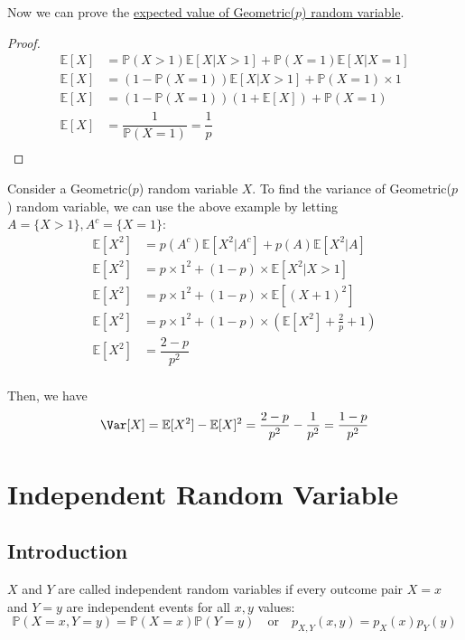 Now we can prove the \hyperlink{page.27}{expected value of Geometric(\(p\)) random variable}. 
\begin{proof}
    \[
        \begin{aligned}
            \mathbb{E}[X] &= \mathbb{P}(X > 1)\mathbb{E}[X \vert X > 1] + \mathbb{P}(X = 1)\mathbb{E}[X \vert X = 1] \\
            \mathbb{E}[X] &= (1 - \mathbb{P}(X = 1))\mathbb{E}[X \vert X > 1] + \mathbb{P}(X = 1) \times 1 \\
            \mathbb{E}[X] &= (1 - \mathbb{P}(X = 1))(1 + \mathbb{E}[X]) + \mathbb{P}(X = 1)\\
            \mathbb{E}[X] &= \dfrac{1}{\mathbb{P}(X = 1)} = \dfrac{1}{p}\\
        \end{aligned}
    \]
\end{proof}

Consider a Geometric(\(p\)) random variable \(X\). To find the variance of Geometric(\(p\)) random variable, we can use the above example by letting \(A = \{X > 1\}, A^c = \{X = 1\}\):
\[
\begin{aligned}
    \mathbb{E}[X^2] &= p(A^c)\mathbb{E}[X^2 \vert A^c] + p(A)\mathbb{E}[X^2 \vert A] \\
    \mathbb{E}[X^2] &= p \times 1^2 + (1 - p) \times \mathbb{E}[X^2 \vert X > 1] \\
    \mathbb{E}[X^2] &= p \times 1^2 + (1 - p) \times \mathbb{E}[(X + 1)^2] \\
    \mathbb{E}[X^2] &= p \times 1^2 + (1 - p) \times (\mathbb{E}[X^2] + \frac{2}{p} + 1) \\
    \mathbb{E}[X^2] &= \dfrac{2 - p}{p^2} \\
\end{aligned}
\]

Then, we have 
\[
    \Var[X] = \mathbb{E}[X^2] - \mathbb{E}[X]^2 = \dfrac{2 - p}{p^2} - \dfrac{1}{p^2} = \dfrac{1 - p}{p^{2}}
\]

\section{Independent Random Variable}
\subsection{Introduction}
\begin{definition}
    \(X\) and \(Y\) are called independent random variables if every outcome pair \(X = x\) and \(Y = y\) are independent events for all \(x, y\) values: 
    \[
        \mathbb{P}(X = x, Y = y) = \mathbb{P}(X = x)\mathbb{P}(Y = y) \quad\text{or}\quad p_{X, Y}(x, y) = p_X(x)p_Y(y)
    \]
\end{definition}

